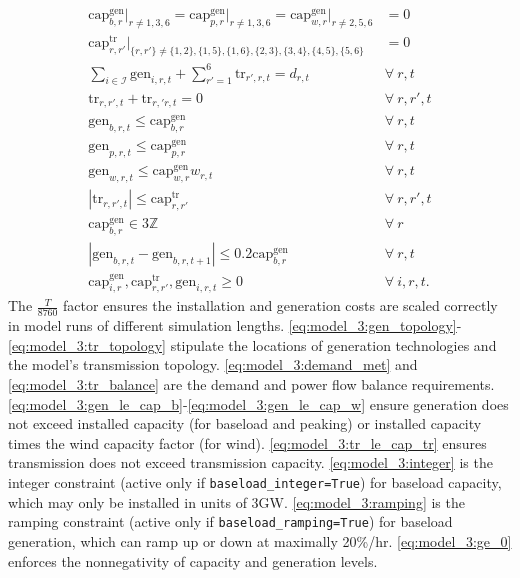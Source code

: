\documentclass[preprint]{elsarticle}
\begin{document}
\begin{align}
\text{cap}_{b,r}^\text{gen} \big\rvert_{r \ne 1, 3, 6} = \text{cap}_{p,r}^\text{gen} \big\rvert_{r \ne 1, 3, 6} = \text{cap}_{w,r}^\text{gen} \big\rvert_{r \ne 2, 5, 6} &= 0 \label{eq:model_3:gen_topology} \\
\text{cap}_{r, r'}^\text{tr} \big\rvert_{\{r, r'\} \ne \{1,2\}, \{1,5\}, \{1,6\}, \{2,3\}, \{3,4\}, \{4,5\}, \{5,6\}} &= 0 \label{eq:model_3:tr_topology} \\
\sum_{i \in \mathcal{I}} \text{gen}_{i,r,t} + \sum_{r'=1}^6 \text{tr}_{r',r,t} = d_{r,t} \quad & \forall \: r, t \label{eq:model_3:demand_met} \\
\text{tr}_{r,r',t} + \text{tr}_{r,'r,t} = 0 \quad & \forall \: r, r', t \label{eq:model_3:tr_balance} \\
\text{gen}_{b,r,t} \le \text{cap}_{b,r}^\text{gen} \quad & \forall \: r, t \label{eq:model_3:gen_le_cap_b} \\
\text{gen}_{p,r,t} \le \text{cap}_{p,r}^\text{gen} \quad & \forall \: r, t \label{eq:model_3:gen_le_cap_p} \\
\text{gen}_{w,r,t} \le \text{cap}_{w,r}^\text{gen} w_{r,t} \quad & \forall \: r, t \label{eq:model_3:gen_le_cap_w} \\
|\text{tr}_{r,r',t}| \le \text{cap}_{r,r'}^\text{tr} \quad & \forall \: r, r', t \label{eq:model_3:tr_le_cap_tr} \\
\text{cap}_{b,r}^\text{gen} \in 3\mathbb{Z} \quad & \forall \: r \label{eq:model_3:integer} \\
|\text{gen}_{b,r,t} - \text{gen}_{b,r,t+1}| \le 0.2 \text{cap}_{b,r}^\text{gen} \quad & \forall \: r, t \label{eq:model_3:ramping} \\
\text{cap}_{i,r}^\text{gen}, \text{cap}_{r,r'}^\text{tr}, \text{gen}_{i,r,t} \ge 0 \quad & \forall \: i, r, t. \label{eq:model_3:ge_0}
\end{align}
\noindent The $\frac{T}{8760}$ factor ensures the installation and generation costs are scaled correctly in model runs of different simulation lengths. \eqref{eq:model_3:gen_topology}-\eqref{eq:model_3:tr_topology} stipulate the locations of generation technologies and the model's transmission topology. \eqref{eq:model_3:demand_met} and \eqref{eq:model_3:tr_balance} are the demand and power flow balance requirements. \eqref{eq:model_3:gen_le_cap_b}-\eqref{eq:model_3:gen_le_cap_w} ensure generation does not exceed installed capacity (for baseload and peaking) or installed capacity times the wind capacity factor (for wind). \eqref{eq:model_3:tr_le_cap_tr} ensures transmission does not exceed transmission capacity. \eqref{eq:model_3:integer} is the integer constraint (active only if \texttt{baseload\_integer=True}) for baseload capacity, which may only be installed in units of 3GW. \eqref{eq:model_3:ramping} is the ramping constraint (active only if \texttt{baseload\_ramping=True}) for baseload generation, which can ramp up or down at maximally 20\%/hr. \eqref{eq:model_3:ge_0} enforces the nonnegativity of capacity and generation levels.
\end{document}

